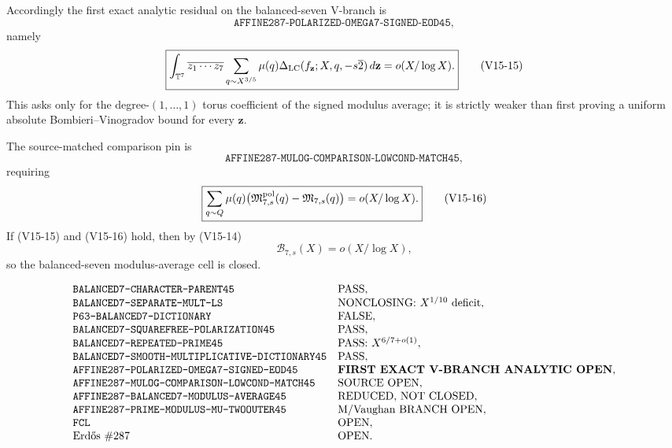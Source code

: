 Accordingly the first exact analytic residual on the balanced-seven V-branch is
\[
 \boxed{\texttt{AFFINE287-POLARIZED-OMEGA7-SIGNED-EOD45}},
\]
namely
\[
 \boxed{
 \int_{\mathbb T^7}
 \overline{z_1\cdots z_7}
 \sum_{q\sim X^{3/5}}\mu(q)
 \Delta_{\rm LC}(f_{\mathbf z};X,q,-s\overline2)
 \,d\mathbf z
 =
 o(X/\log X).
 }
 \tag{V15-15}
\]
This asks only for the degree-$(1,\ldots,1)$ torus coefficient of the signed modulus
average; it is strictly weaker than first proving a uniform absolute Bombieri--Vinogradov
bound for every $\mathbf z$.

The source-matched comparison pin is
\[
 \boxed{\texttt{AFFINE287-MULOG-COMPARISON-LOWCOND-MATCH45}},
\]
requiring
\[
 \boxed{
 \sum_{q\sim Q}\mu(q)
 \bigl(\mathfrak M^{\rm pol}_{7,s}(q)-\mathfrak M_{7,s}(q)\bigr)
 =
 o(X/\log X).
 }
 \tag{V15-16}
\]
If (V15-15) and (V15-16) hold, then by (V15-14)
\[
 \mathcal B_{7,s}(X)=o(X/\log X),
\]
so the balanced-seven modulus-average cell is closed.

\begin{status}
\[
\begin{array}{ll}
\texttt{BALANCED7-CHARACTER-PARENT45} & \text{PASS},\\
\texttt{BALANCED7-SEPARATE-MULT-LS} & \text{NONCLOSING: }X^{1/10}\text{ deficit},\\
\texttt{P63-BALANCED7-DICTIONARY} & \text{FALSE},\\
\texttt{BALANCED7-SQUAREFREE-POLARIZATION45} & \text{PASS},\\
\texttt{BALANCED7-REPEATED-PRIME45} & \text{PASS: }X^{6/7+o(1)},\\
\texttt{BALANCED7-SMOOTH-MULTIPLICATIVE-DICTIONARY45} & \text{PASS},\\
\texttt{AFFINE287-POLARIZED-OMEGA7-SIGNED-EOD45} & \textbf{FIRST EXACT V-BRANCH ANALYTIC OPEN},\\
\texttt{AFFINE287-MULOG-COMPARISON-LOWCOND-MATCH45} & \text{SOURCE OPEN},\\
\texttt{AFFINE287-BALANCED7-MODULUS-AVERAGE45} & \text{REDUCED, NOT CLOSED},\\
\texttt{AFFINE287-PRIME-MODULUS-MU-TWOOUTER45} & \text{M/Vaughan BRANCH OPEN},\\
\texttt{FCL} & \text{OPEN},\\
\text{Erd\H{o}s \#287} & \text{OPEN}.
\end{array}
\]
\end{status}

